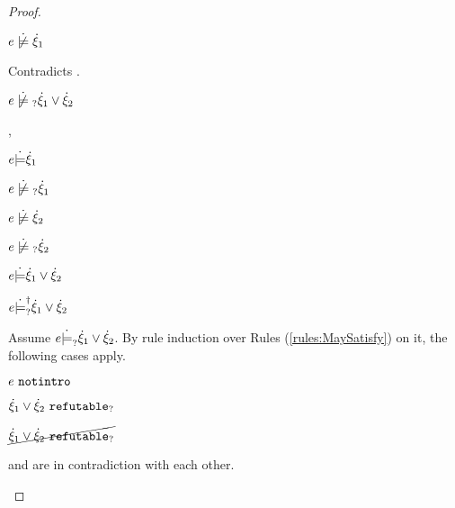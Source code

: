 \begin{proof}
\begin{byCases}
\begin{byCases}
\begin{byCases}
\begin{pfsteps*}
            \item $\cnotsatisfy{e}{\hxi_1}$ 
            \end{pfsteps*}
            Contradicts .
        \end{byCases}
        \begin{pfsteps*}
        \item $\cnotmaysatisfy{e}{\cor{\hxi_1}{\hxi_2}}$ 
        \end{pfsteps*}
    \item[\csatisfy{e}{\hxi_1},\cnotsatisfyormay{e}{\hxi_2}]
        \begin{pfsteps*}
        \item $e \dot{\models} \dot{\xi}_1$  
        \item $\cnotmaysatisfy{e}{\hxi_1}$  
        \item $\cnotsatisfy{e}{\hxi_2}$  
        \item $\cnotmaysatisfy{e}{\hxi_2}$  
        \item $e \dot{\models} \dot{\xi}_1 \vee \dot{\xi}_2$  
        \item $e \dot{\models}_{?}^{\dag} \dot{\xi}_1 \vee \dot{\xi}_2$ 
        \end{pfsteps*}
        Assume $e \dot{\models}_{?} \dot{\xi}_1 \vee \dot{\xi}_2$. By rule induction over Rules (\ref{rules:MaySatisfy}) on it, the following cases apply.
        \begin{byCases}
        \item[\text{(\ref{rule:CMSNotIntro})}]
          \begin{pfsteps*}
          \item $e ~\mathtt{notintro}$  
          \item $\dot{\xi}_1 \vee \dot{\xi}_2 ~\mathtt{refutable}_?$  
          \item $\cancel{\dot{\xi}_1 \vee \dot{\xi}_2 ~\mathtt{refutable}_?}$  
          \end{pfsteps*}
           and  are in contradiction with each other.

\end{byCases}
\end{byCases}
\end{byCases}
\end{proof}
